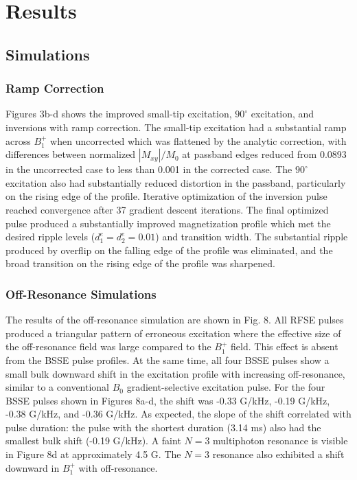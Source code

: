 \documentclass{article}
\begin{document}
\section*{Results}
\subsection*{Simulations}
\subsubsection*{Ramp Correction}
Figures 3b-d shows the improved small-tip excitation, 
$90^\circ$ excitation, and inversions with ramp correction. 
The small-tip excitation had a substantial ramp across $B_1^+$ when uncorrected 
which was flattened by the analytic correction, 
with differences between normalized $|M_{xy}|/M_0$ at passband edges reduced from 0.0893 in the uncorrected case to less than 0.001 in the corrected case. 
The $90^\circ$ excitation also had substantially reduced distortion
in the passband, particularly on the rising edge of the profile. 
Iterative optimization of the inversion pulse reached convergence after 37 gradient descent iterations. 
The final optimized pulse produced a substantially improved magnetization profile which met the desired ripple levels ($d_1^e=d_2^e=0.01$) and transition width. 
The substantial ripple produced by overflip on the falling edge of the profile was eliminated, 
and the broad transition on the rising edge of the profile was sharpened. 

\subsubsection*{Off-Resonance Simulations}
The results of the off-resonance simulation are shown in Fig. 8. 
All RFSE pulses produced a triangular pattern of erroneous excitation 
where the effective size of the off-resonance field was large compared to the $B_1^+$ field.
This effect is absent from the BSSE pulse profiles. 
At the same time, 
all four BSSE pulses show a small 
bulk downward shift in the excitation profile with increasing off-resonance,
similar to  a conventional $B_0$ gradient-selective excitation pulse. 
For the four BSSE pulses shown in Figures 8a-d, 
the shift was -0.33 G/kHz, -0.19 G/kHz, -0.38 G/kHz, and -0.36 G/kHz. 
As expected, the slope of the shift correlated with pulse duration: 
the pulse with the shortest duration (3.14 ms) also had the smallest bulk shift (-0.19 G/kHz). 
A faint $N=3$ multiphoton resonance is visible in Figure 8d at approximately 4.5 G. 
The $N=3$ resonance also exhibited a shift downward in $B_1^+$ with off-resonance.
\end{document}
